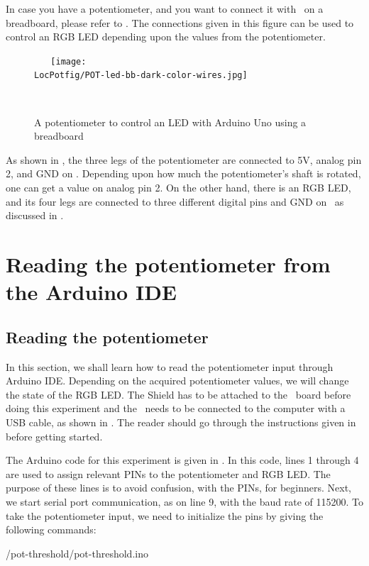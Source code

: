 In case you have a potentiometer, and you want to connect it with \arduino\ on a breadboard, 
please refer to . The connections given in this figure 
can be used to control an RGB LED depending upon the values from the potentiometer.  
\begin{figure}
  \centering
  \texttt{[image: \\LocPotfig/POT-led-bb-dark-color-wires.jpg]}
  \caption{A potentiometer to control an LED with Arduino Uno using a breadboard}
  \label{fig:pot-led}
\end{figure}
As shown in , the three legs of the potentiometer are connected to 
5V, analog pin 2, and GND on \arduino. Depending upon how much the potentiometer's shaft is rotated, one can get a value on analog pin 2. On the other hand, 
there is an RGB LED, and its four legs are connected to three different digital pins and GND on \arduino\, as discussed in 
.


\section{Reading the potentiometer from the Arduino IDE}
\subsection{Reading the potentiometer}
In this section, we shall learn how to read the potentiometer 
input through Arduino IDE. Depending on the acquired potentiometer 
values, we will change the state of the RGB LED. The Shield has to be attached to the \arduino\ board
before doing this experiment and the \arduino\ needs to be connected to the computer 
with a USB cable, as shown in . The reader should go through the
instructions given in  before getting started.

The Arduino code for this experiment is given in . 
In this code, lines 1 through 4 are used to assign relevant PINs to 
the potentiometer and RGB LED. The purpose of these lines is to avoid 
confusion, with the PINs, for beginners. Next, we start serial port 
communication, as on line 9, with the baud rate of 115200. 
To take the potentiometer input, we need to initialize the pins by 
giving the following commands:


{\LocPotardcode/pot-threshold/pot-threshold.ino}

